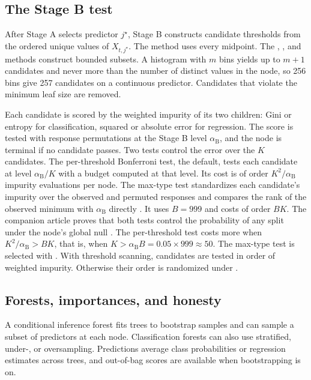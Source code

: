 \documentclass[article]{jss}
\begin{document}
\subsection{The Stage B test} \label{sec:thresholds}

After Stage A selects predictor $j^\star$, Stage B constructs candidate
thresholds from the ordered unique values of $X_{t,j^\star}$. The
 method uses every midpoint. The ,
, and  methods construct bounded subsets.
A histogram with $m$ bins yields up to $m+1$ candidates and never more than
the number of distinct values in the node, so 256 bins give 257 candidates on
a continuous predictor. Candidates that violate the minimum leaf size are
removed.

Each candidate is scored by the weighted impurity of its two children: Gini or
entropy for classification, squared or absolute error for regression. The
score is tested with response permutations at the Stage B level
$\alpha_{\mathrm{B}}$, and the node is terminal if no candidate passes. Two
tests control the error over the $K$ candidates. The per-threshold Bonferroni
test, the default, tests each candidate at level $\alpha_{\mathrm{B}}/K$ with
a budget computed at that level. Its cost is of order $K^2/\alpha_{\mathrm{B}}$
impurity evaluations per node. The max-type test standardizes each candidate's
impurity over the observed and permuted responses and compares the rank of the
observed minimum with $\alpha_{\mathrm{B}}$ directly
\citep{Westfall+Young:1993,Pollard+vanderLaan:2004}. It uses $B = 999$ and
costs of order $BK$. The companion article proves that both tests control the
probability of any split under the node's global null
\citep{Milletich+Downes+Goley+Hirst:2026}. The per-threshold test costs more
when $K^2/\alpha_{\mathrm{B}} > BK$, that is, when
$K > \alpha_{\mathrm{B}} B = 0.05 \times 999 \approx 50$. The max-type test is
selected with . With threshold scanning,
candidates are tested in order of weighted impurity. Otherwise their order is
randomized under .

\subsection{Forests, importances, and honesty} \label{sec:forests}

A conditional inference forest fits trees to bootstrap samples and can sample
a subset of predictors at each node. Classification forests can also use
stratified, under-, or oversampling. Predictions average class probabilities
or regression estimates across trees, and out-of-bag scores are available when
bootstrapping is on.
\end{document}
